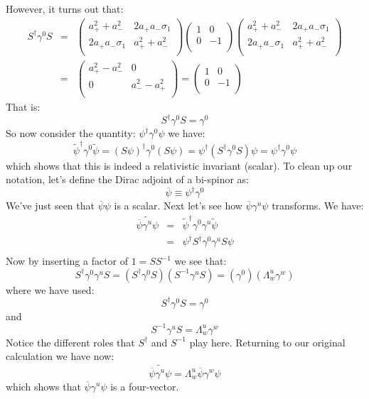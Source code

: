 \documentclass[12pt]{book}
\begin{document}
However, it turns out that:
\begin{eqnarray*}
S^\dagger \gamma^0 S &=& 
\begin{pmatrix}
a_+^2+a_-^2        & 2 a_+ a_- \sigma_1 \\
2 a_+ a_- \sigma_1 & a_+^2+a_-^2 \\
\end{pmatrix}
\begin{pmatrix}
1        & 0 \\
0        & -1 \\
\end{pmatrix}
\begin{pmatrix}
a_+^2+a_-^2        & 2 a_+ a_- \sigma_1 \\
2 a_+ a_- \sigma_1 & a_+^2+a_-^2 \\
\end{pmatrix}\\[3pt]
&=& \begin{pmatrix}
a_+^2-a_-^2        & 0 \\
0                  & a_-^2-a_+^2 \\
\end{pmatrix}
= \begin{pmatrix}
1        & 0 \\
0        & -1 \\
\end{pmatrix}
\end{eqnarray*}
That is:
$$S^\dagger \gamma^0 S = \gamma^0$$
So now consider the quantity:
$\psi^\dagger \gamma^0 \psi$
we have:
$$\widetilde{\psi}^\dagger \gamma^0 \widetilde{\psi}
= (S \psi)^\dagger \gamma^0 (S \psi) 
= \psi^\dagger (S^\dagger \gamma^0 S) \psi
= \psi^\dagger \gamma^0 \psi
$$
which shows that this is indeed a relativistic invariant (scalar).  To clean up our notation, let's define the Dirac adjoint of a bi-spinor as:
$$\overline{\psi} \equiv \psi^\dagger \gamma^0 $$
We've just seen that $\overline{\psi} \psi$ is a scalar.  Next let's see how $\overline{\psi} \gamma^u \psi$ transforms.  We have:
\begin{eqnarray*}
\widetilde{\overline{\psi} \gamma^u \psi} &=& 
\widetilde{\psi}^\dagger \gamma^0 \gamma^u \widetilde{\psi} \\
&=& \psi^\dagger S^\dagger \gamma^0 \gamma^u S \psi \\
\end{eqnarray*}
Now by inserting a factor of $1 = S S^{-1}$ we see that:
$$S^\dagger \gamma^0 \gamma^u S = (S^\dagger \gamma^0 S) (S^{-1}\gamma^u S)
= (\gamma^0) (\Lambda^u_w \gamma^w)$$
where we have used:
$$S^\dagger \gamma^0 S = \gamma^0$$
and
$$S^{-1} \gamma^u S = \Lambda^u_w \gamma^w$$
Notice the different roles that $S^\dagger$ and $S^{-1}$ play here.  Returning to our original calculation we have now:
$$\widetilde{\overline{\psi} \gamma^u \psi} = \Lambda^u_w \overline{\psi} \gamma^w \psi$$
which shows that $\overline{\psi} \gamma^u \psi$ is a four-vector.
\end{document}
